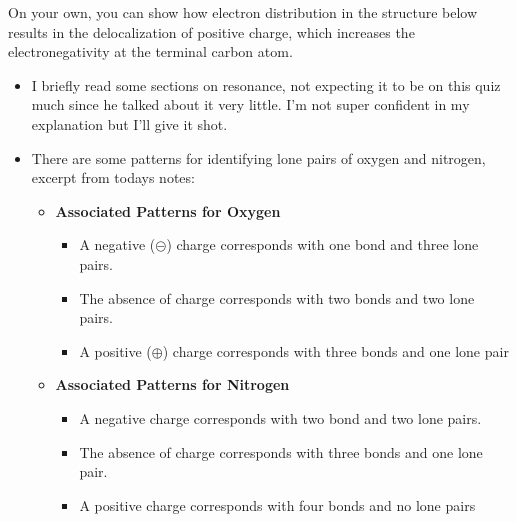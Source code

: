 \documentclass[12pt,a4paper]{article}
\begin{document}
\begin{enumerate}
\begin{itemize}
\begin{itemize}
                \end{itemize}
        \end{itemize}
    \newpage
    {\color{G-Moon}\item On your own, you can show how electron distribution in the structure below results in the delocalization of positive charge, which increases the electronegativity at the terminal carbon atom.
    \begin{center}
    \end{center}}
    \begin{itemize}
        \item I briefly read some sections on resonance, not expecting it to be on this quiz much since he talked about it very little. I'm not super confident in my explanation but I'll give it shot.
        \item There are some patterns for identifying lone pairs of oxygen and nitrogen, excerpt from todays notes:
            \begin{itemize}
                \item \textbf{Associated Patterns for Oxygen}
                \begin{itemize}
                    \item A {\color{neg}negative ($\circleddash$)} charge corresponds with {\color{o-Sun}one bond} and {\color{o-Sun}three lone pairs}.
                    \item The {\color{G-Moon}absence} of charge corresponds with {\color{o-Sun}two bonds} and {\color{o-Sun}two lone pairs}.
                    \item A {\color{pos}positive ($\oplus$)} charge corresponds with {\color{o-Sun}three bonds} and {\color{o-Sun}one lone pair} 
                \end{itemize}
            \item \textbf{Associated Patterns for Nitrogen}
                \begin{itemize}
                    \item A {\color{neg}negative} charge corresponds with {\color{o-Sun}two bond} and {\color{o-Sun}two lone pairs}.
                    \item The {\color{G-Moon}absence} of charge corresponds with {\color{o-Sun}three bonds} and {\color{o-Sun}one lone pair}.
                    \item A {\color{pos}positive} charge corresponds with {\color{o-Sun}four bonds} and {\color{o-Sun}no lone pairs}

\end{itemize}
\end{itemize}
\end{itemize}
\end{enumerate}
\end{document}
